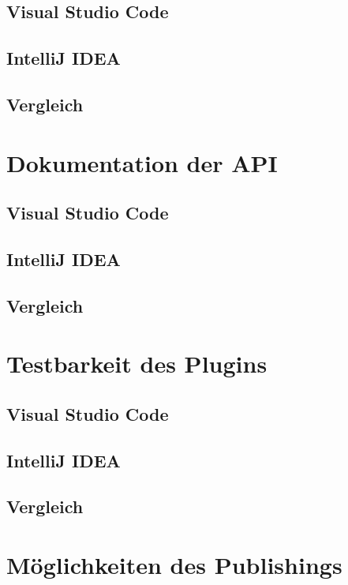 \subsection{Visual Studio Code}

\subsection{IntelliJ IDEA}

\subsection{Vergleich}


\section{Dokumentation der API}
\label{sec:Vergleich_Dokumentation}

\subsection{Visual Studio Code}

\subsection{IntelliJ IDEA}

\subsection{Vergleich}


\section{Testbarkeit des Plugins}
\label{sec:Vergleich_Testbarkeit}

\subsection{Visual Studio Code}

\subsection{IntelliJ IDEA}

\subsection{Vergleich}


\section{Möglichkeiten des Publishings}
\label{sec:Vergleich_Publishing}

